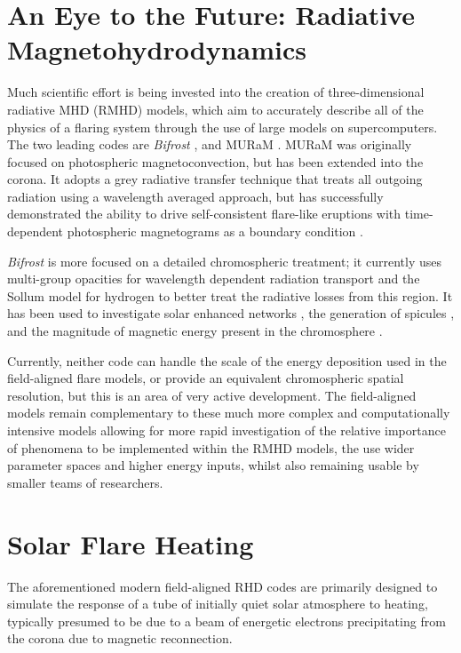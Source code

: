 \section{An Eye to the Future: Radiative Magnetohydrodynamics}

Much scientific effort is being invested into the creation of three-dimensional radiative MHD (RMHD) models, which aim to accurately describe all of the physics of a flaring system through the use of large models on supercomputers. The two leading codes are \textit{Bifrost} \citep{Gudiksen2011}, and MURaM \citep{Rempel2009,Rempel2016}. MURaM was originally focused on photospheric magnetoconvection, but has been extended into the corona. It adopts a grey radiative transfer technique that treats all outgoing radiation using a wavelength averaged approach, but has successfully demonstrated the ability to drive self-consistent flare-like eruptions with time-dependent photospheric magnetograms as a boundary condition \citep{Cheung2019}.

\textit{Bifrost} is more focused on a detailed chromospheric treatment; it currently uses multi-group opacities for wavelength dependent radiation transport and the Sollum model for hydrogen \NeedRef{} to better treat the radiative losses from this region.
It has been used to investigate solar enhanced networks \citep{Carlsson2016}, the generation of spicules \citep{Martinez-Sykora2017}, and the magnitude of magnetic energy present in the chromosphere \citep{Martinez-Sykora2019} .

Currently, neither code can handle the scale of the energy deposition used in the field-aligned flare models, or provide an equivalent chromospheric spatial resolution, but this is an area of very active development.
The field-aligned models remain complementary to these much more complex and computationally intensive models allowing for more rapid investigation of the relative importance of phenomena to be implemented within the RMHD models, the use wider parameter spaces and higher energy inputs, whilst also remaining usable by smaller teams of researchers.


\section{Solar Flare Heating}

The aforementioned modern field-aligned RHD codes are primarily designed to simulate the response of a tube of initially quiet solar atmosphere to heating, typically presumed to be due to a beam of energetic electrons precipitating from the corona due to magnetic reconnection.

